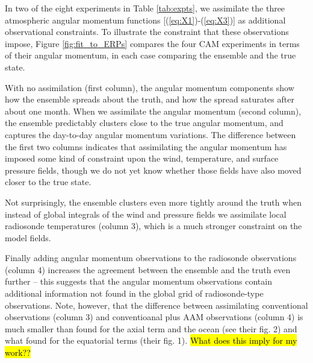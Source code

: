 In two of the eight experiments in Table \ref{tab:expts}, we assimilate the three atmospheric angular momentum functions [(\ref{eq:X1})-(\ref{eq:X3})] as additional observational constraints.
To illustrate the constraint that these observations impose, Figure \ref{fig:fit_to_ERPs} compares the four CAM experiments in terms of their angular momentum, in each case comparing the ensemble and the true state.

With no assimilation (first column), the angular momentum components show how the ensemble spreads about the truth, and how the spread saturates after about one month.
When we assimilate the angular momentum (second column), the ensemble predictably clusters close to the true angular momentum, and captures the day-to-day angular momentum variations. 
The difference between the first two columns indicates that assimilating the angular momentum has imposed some kind of constraint upon the wind, temperature, and surface pressure fields, though we do not yet know whether those fields have also moved closer to the true state. 

Not surprisingly, the ensemble clusters even more tightly around the truth when instead of global integrals of the wind and pressure fields we assimilate local radiosonde temperatures (column 3), which is a much stronger constraint on the model fields. 

Finally adding angular momentum observations to the radiosonde observations (column 4) increases the agreement between the ensemble and the truth even further -- this suggests that the angular momentum observations contain additional information not found in the global grid of radiosonde-type observations.  
Note, however, that the difference between assimilating conventional observations (column 3) and conventioanal plus AAM observations (column 4) is much smaller than \citet{Saynisch2010} found for the axial term and the ocean (see their fig. 2) and what \citet{Saynisch2011} found for the equatorial terms (their fig. 1).   
\hl{What does this imply for my work??}
